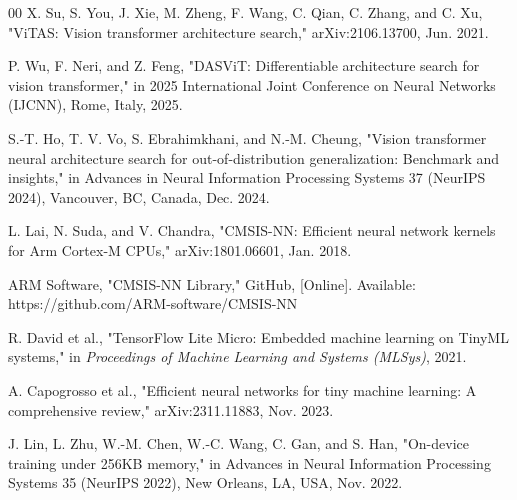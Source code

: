 \documentclass[conference]{IEEEtran}
\begin{document}
\begin{thebibliography}{00}
		X. Su, S. You, J. Xie, M. Zheng, F. Wang, C. Qian, C. Zhang, and C. Xu, "ViTAS: Vision transformer architecture search," arXiv:2106.13700, Jun. 2021.
		
		P. Wu, F. Neri, and Z. Feng, "DASViT: Differentiable architecture search for vision transformer," in 2025 International Joint Conference on Neural Networks (IJCNN), Rome, Italy, 2025.
		
		S.-T. Ho, T. V. Vo, S. Ebrahimkhani, and N.-M. Cheung, "Vision transformer neural architecture search for out-of-distribution generalization: Benchmark and insights," in Advances in Neural Information Processing Systems 37 (NeurIPS 2024), Vancouver, BC, Canada, Dec. 2024.
		
		L. Lai, N. Suda, and V. Chandra, "CMSIS-NN: Efficient neural network kernels for Arm Cortex-M CPUs," arXiv:1801.06601, Jan. 2018.
		
		ARM Software, "CMSIS-NN Library," GitHub, [Online]. Available: https://github.com/ARM-software/CMSIS-NN
		
		R. David et al., "TensorFlow Lite Micro: Embedded machine learning on TinyML systems," in \textit{Proceedings of Machine Learning and Systems (MLSys)}, 2021.
		
		A. Capogrosso et al., "Efficient neural networks for tiny machine learning: A comprehensive review," arXiv:2311.11883, Nov. 2023.
		
		J. Lin, L. Zhu, W.-M. Chen, W.-C. Wang, C. Gan, and S. Han, "On-device training under 256KB memory," in Advances in Neural Information Processing Systems 35 (NeurIPS 2022), New Orleans, LA, USA, Nov. 2022.
		
	\end{thebibliography}	
\end{document}
